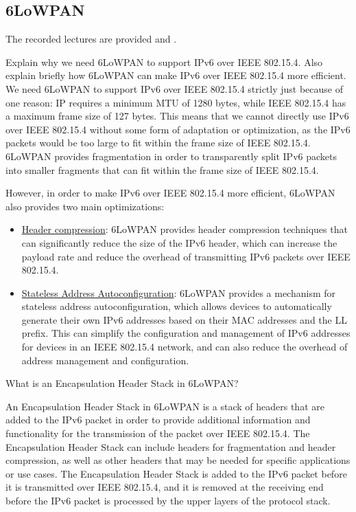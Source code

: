 \newpage\subsection{6LoWPAN}

The recorded lectures are provided  and .

\begin{ejercicio}
    Explain why we need 6LoWPAN to support IPv6 over IEEE 802.15.4. Also explain briefly how 6LoWPAN can make IPv6 over IEEE 802.15.4 more efficient.\\

    We need 6LoWPAN to support IPv6 over IEEE 802.15.4 strictly just because of one reason: IP requires a minimum MTU of 1280 bytes, while IEEE 802.15.4 has a maximum frame size of 127 bytes. This means that we cannot directly use IPv6 over IEEE 802.15.4 without some form of adaptation or optimization, as the IPv6 packets would be too large to fit within the frame size of IEEE 802.15.4. 6LoWPAN provides fragmentation in order to transparently split IPv6 packets into smaller fragments that can fit within the frame size of IEEE 802.15.4.

    However, in order to make IPv6 over IEEE 802.15.4 more efficient, 6LoWPAN also provides two main optimizations:
    \begin{itemize}
        \item \ul{Header compression}: 6LoWPAN provides header compression techniques that can significantly reduce the size of the IPv6 header, which can increase the payload rate and reduce the overhead of transmitting IPv6 packets over IEEE 802.15.4.
        \item \ul{Stateless Address Autoconfiguration}: 6LoWPAN provides a mechanism for stateless address autoconfiguration, which allows devices to automatically generate their own IPv6 addresses based on their MAC addresses and the LL prefix. This can simplify the configuration and management of IPv6 addresses for devices in an IEEE 802.15.4 network, and can also reduce the overhead of address management and configuration.
    \end{itemize}
\end{ejercicio}

\begin{ejercicio}
    What is an Encapsulation Header Stack in 6LoWPAN?

    An Encapsulation Header Stack in 6LoWPAN is a stack of headers that are added to the IPv6 packet in order to provide additional information and functionality for the transmission of the packet over IEEE 802.15.4. The Encapsulation Header Stack can include headers for fragmentation and header compression, as well as other headers that may be needed for specific applications or use cases. The Encapsulation Header Stack is added to the IPv6 packet before it is transmitted over IEEE 802.15.4, and it is removed at the receiving end before the IPv6 packet is processed by the upper layers of the protocol stack.
\end{ejercicio}

